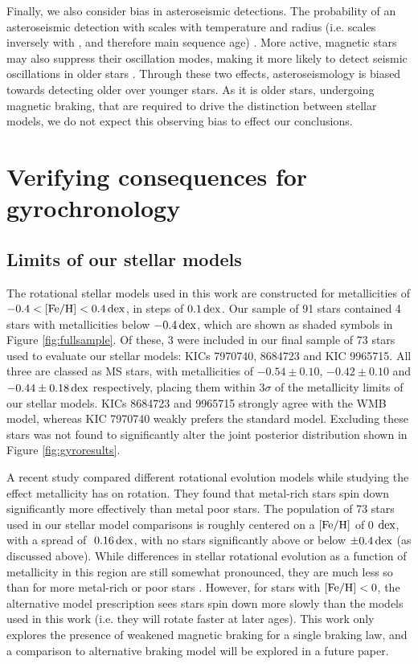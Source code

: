 Finally, we also consider bias in asteroseismic detections. The probability of an asteroseismic detection with \kepler scales with temperature and radius (i.e. scales inversely with \logg, and therefore main sequence age) \cite{m_chaplin+2011, m_schofield+2019}. More active, magnetic stars may also suppress their oscillation modes, making it more likely to detect seismic oscillations in older stars \cite{m_mathur+2019}. Through these two effects, asteroseismology is biased towards detecting older over younger stars. As it is older stars, undergoing magnetic braking, that are required to drive the distinction between stellar models, we do not expect this observing bias to effect our conclusions.

\section{Verifying consequences for gyrochronology}
\subsection{Limits of our stellar models}\label{ssec:limits}
The rotational stellar models used in this work \cite{m_vansaders+2019} are constructed for metallicities of $-0.4 < \rm{[Fe/H]} < 0.4\, \rm{dex}$, in steps of $0.1\, \rm {dex}$. Our sample of 91 stars contained 4 stars with metallicities below $-0.4\, \rm{dex}$, which are shown as shaded symbols in Figure \ref{fig:fullsample}. Of these, 3 were included in our final sample of 73 stars used to evaluate our stellar models: KICs 7970740, 8684723 and KIC 9965715. All three are classed as MS stars, with metallicities of $-0.54 \pm 0.10$, $-0.42 \pm 0.10$ and $-0.44 \pm 0.18\, \rm {dex}$ respectively, placing them within $3\sigma$ of the metallicity limits of our stellar models. KICs 8684723 and 9965715 strongly agree with the WMB model, whereas KIC 7970740 weakly prefers the standard model. Excluding these stars was not found to significantly alter the joint posterior distribution shown in Figure \ref{fig:gyroresults}.

A recent study \cite{m_amard+matt2020} compared different rotational evolution models \cite[of which we use the former in this work]{m_vansaders+pinsonneault2013,m_matt+2015} while studying the effect metallicity has on rotation. They found that metal-rich stars spin down significantly more effectively than metal poor stars. The population of 73 stars used in our stellar model comparisons is roughly centered on a $\rm{[Fe/H]}$ of 0 $\rm dex$, with a spread of $~0.16\, \rm dex$, with no stars significantly above or below $\pm 0.4\, \rm dex$ (as discussed above). While differences in stellar rotational evolution as a function of metallicity in this region are still somewhat pronounced, they are much less so than for more metal-rich or poor stars \cite[see Figure 2]{m_amard+matt2020}. However, for stars with $\mbox{$\rm{[Fe/H]}$} < 0$, the alternative model prescription \cite{m_matt+2015} sees stars spin down more slowly than the models used in this work (i.e. they will rotate faster at later ages). This work only explores the presence of weakened magnetic braking for a single braking law, and a comparison to alternative braking model will be explored in a future paper.


